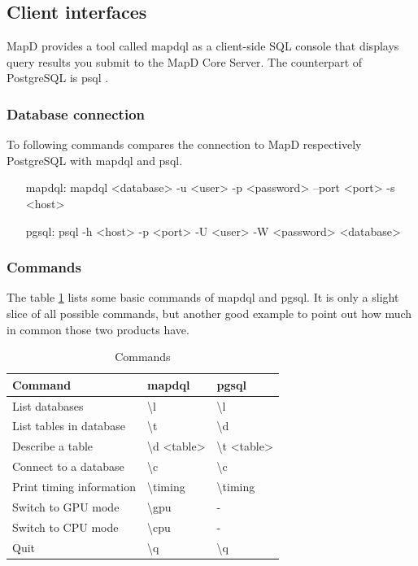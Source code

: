 \newpage
\subsection{Client interfaces}
MapD provides a tool called mapdql \cite{mapdql} as a client-side SQL console that displays query results you submit to the MapD Core Server.
The counterpart of PostgreSQL is psql \cite{psql}.

\subsubsection{Database connection}
To following commands compares the connection to MapD respectively PostgreSQL with mapdql and psql.
\begin{itemize}[noitemsep]
 \item[mapdql:]  mapdql <database>  -u <user> -p <password> --port <port> -s <host>
 \item[pgsql:]  psql -h <host> -p <port> -U <user> -W <password> <database>
\end{itemize}

\subsubsection{Commands}
The table \ref{tab:commands} lists some basic commands of mapdql and pgsql.
It is only a slight slice of all possible commands, but another good example to point out how much in common those two products have.
\begin{table}[H]
\centering
\begin{tabular}{ |l|l|l| }
\hline
Command & mapdql & pgsql  \\
\hline
	List databases & \textbackslash l &  \textbackslash l \\
	List tables in database & \textbackslash t &  \textbackslash d \\
	Describe a table & \textbackslash d <table> & \textbackslash t <table> \\
	Connect to a database &  \textbackslash c  & \textbackslash c \\
	Print timing information & \textbackslash timing & \textbackslash timing \\
	Switch to GPU mode & \textbackslash gpu & - \\
	Switch to CPU mode & \textbackslash cpu & - \\
	Quit & \textbackslash q & \textbackslash q \\
\hline
\end{tabular}
\caption{Commands}
\label{tab:commands}
\end{table}

